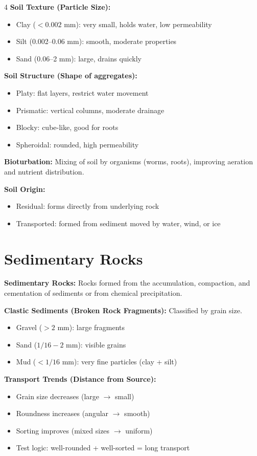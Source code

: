 \documentclass[10pt]{article}
\begin{document}
\begin{multicols}{4}
\textbf{Soil Texture (Particle Size):}
\begin{itemize}
\item Clay ($<0.002$ mm): very small, holds water, low permeability
\item Silt (0.002–0.06 mm): smooth, moderate properties
\item Sand (0.06–2 mm): large, drains quickly
\end{itemize}

\textbf{Soil Structure (Shape of aggregates):}
\begin{itemize}
\item Platy: flat layers, restrict water movement
\item Prismatic: vertical columns, moderate drainage
\item Blocky: cube-like, good for roots
\item Spheroidal: rounded, high permeability
\end{itemize}

\textbf{Bioturbation:}
Mixing of soil by organisms (worms, roots), improving aeration and nutrient distribution.

\textbf{Soil Origin:}
\begin{itemize}
\item Residual: forms directly from underlying rock
\item Transported: formed from sediment moved by water, wind, or ice
\end{itemize}

\section*{Sedimentary Rocks}

\textbf{Sedimentary Rocks:}
Rocks formed from the accumulation, compaction, and cementation of sediments or from chemical precipitation.

\textbf{Clastic Sediments (Broken Rock Fragments):}
Classified by grain size.
\begin{itemize}
\item Gravel ($>2$ mm): large fragments
\item Sand ($1/16 - 2$ mm): visible grains
\item Mud ($<1/16$ mm): very fine particles (clay + silt)
\end{itemize}

\textbf{Transport Trends (Distance from Source):}
\begin{itemize}
\item Grain size decreases (large $\rightarrow$ small)
\item Roundness increases (angular $\rightarrow$ smooth)
\item Sorting improves (mixed sizes $\rightarrow$ uniform)
\item Test logic: well-rounded + well-sorted = long transport
\end{itemize}


\end{multicols}
\end{document}
